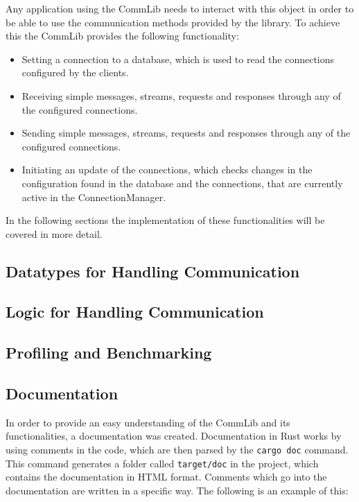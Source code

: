 Any application using the CommLib needs to interact with this object in order to be able to use the communication methods provided by the library. 
To achieve this the CommLib provides the following functionality:

\begin{itemize}
	\item Setting a connection to a database, which is used to read the connections configured by the clients.
	\item Receiving simple messages, streams, requests and responses through any of the configured connections.
	\item Sending simple messages, streams, requests and responses through any of the configured connections.
	\item Initiating an update of the connections, which checks changes in the configuration found in the database and the connections, that are currently active in the ConnectionManager.
\end{itemize}

In the following sections the implementation of these functionalities will be covered in more detail.

\subsection{Datatypes for Handling Communication}

\subsection{Logic for Handling Communication}

\subsection{Profiling and Benchmarking}

\subsection{Documentation}
In order to provide an easy understanding of the CommLib and its functionalities, a documentation was created.
Documentation in Rust works by using comments in the code, which are then parsed by the \verb+cargo doc+ command. 
This command generates a folder called \verb+target/doc+ in the project, which contains the documentation in HTML format.
Comments which go into the documentation are written in a specific way.
The following is an example of this: 

